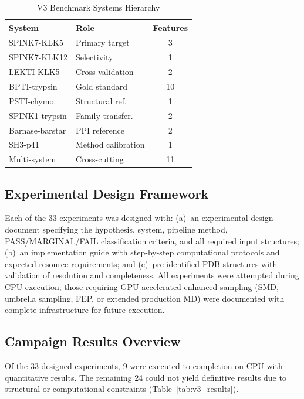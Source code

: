 \documentclass[conference]{IEEEtran}
\begin{document}
\begin{table}[H]
  \centering
  \caption{V3 Benchmark Systems Hierarchy}
  \label{tab:v3_systems}
  \small
  \begin{tabular}{@{}llc@{}}
    \toprule
    \textbf{System} & \textbf{Role} & \textbf{Features} \\
    \midrule
    SPINK7-KLK5 & Primary target & 3 \\
    SPINK7-KLK12 & Selectivity & 1 \\
    LEKTI-KLK5 & Cross-validation & 2 \\
    BPTI-trypsin & Gold standard & 10 \\
    PSTI-chymo. & Structural ref. & 1 \\
    SPINK1-trypsin & Family transfer. & 2 \\
    Barnase-barstar & PPI reference & 2 \\
    SH3-p41 & Method calibration & 1 \\
    Multi-system & Cross-cutting & 11 \\
    \bottomrule
  \end{tabular}
\end{table}

\subsection{Experimental Design Framework}\label{sec:v3_design}

Each of the 33 experiments was designed with: (a)~an experimental design
document specifying the hypothesis, system, pipeline method, PASS/MARGINAL/FAIL
classification criteria, and all required input structures;
(b)~an implementation guide with step-by-step computational protocols and
expected resource requirements; and (c)~pre-identified PDB structures with
validation of resolution and completeness.  All experiments were attempted
during CPU execution; those requiring GPU-accelerated enhanced sampling
(SMD, umbrella sampling, FEP, or extended production MD) were documented
with complete infrastructure for future execution.

\subsection{Campaign Results Overview}\label{sec:v3_overview}

Of the 33 designed experiments, 9 were executed to completion on CPU with
quantitative results.  The remaining 24 could not yield definitive results
due to structural or computational constraints
(Table~\ref{tab:v3_results}).
\end{document}
